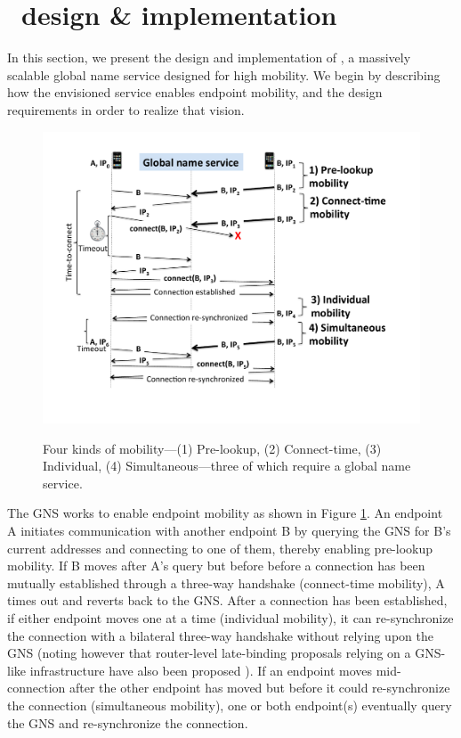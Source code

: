 
\vsp
\section{ \auspice\ design \& implementation}
\label{sec:design}

In this section, we present the design and implementation of \auspice, a massively scalable global name service designed for high mobility. We begin by describing how the envisioned service enables endpoint mobility, and the design requirements in order to realize that vision.


\begin{figure}[htbp]
\begin{center}
\vspace{-0.1in}
\includegraphics[scale=0.3]{auspice/figure/4mobility.pdf}
\vspace{-0.5in}
\caption{Four kinds of mobility---(1) Pre-lookup, (2) Connect-time, (3) Individual, (4) Simultaneous---three of which require a global name service.} 
\vspace{-0.3in}
\label{fig:4mobility}
\end{center}
\end{figure}

{The GNS works to enable endpoint mobility as shown in Figure \ref{fig:4mobility}. An endpoint A initiates communication with another endpoint B by querying the GNS for B's current addresses and connecting to one of them, thereby enabling pre-lookup mobility. If B moves after A's query but before before a connection has been mutually established through a three-way handshake (connect-time mobility), A times out and reverts back to the GNS. After a connection has been established, if either endpoint moves one at a time (individual mobility), it can re-synchronize the connection with a bilateral three-way handshake without relying upon the GNS (noting however that router-level late-binding proposals relying on a GNS-like infrastructure have also been proposed \cite{serval,MobilityFirst-UMASS}). If an endpoint moves mid-connection after the other endpoint has moved but before it could re-synchronize the connection (simultaneous mobility), one or both endpoint(s) eventually query the GNS and re-synchronize the connection.}



